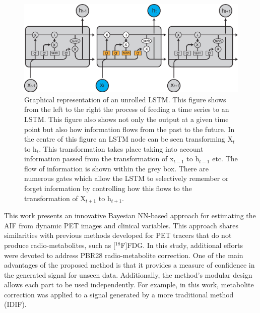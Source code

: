         \begin{figure}
            \centering
            
            \includegraphics[width=1.0\linewidth]{figures/background_lstm.png}
            
            \captionsetup{singlelinecheck=false}
            \caption{
                Graphical representation of an unrolled \gls{LSTM}. This figure shows from the left to the right the process of feeding a time series to an \gls{LSTM}. This figure also shows not only the output at a given time point but also how information flows from the past to the future. In the centre of this figure an \gls{LSTM} node can be seen transforming X$_t$ to h$_t$. This transformation takes place taking into account information passed from the transformation of x$_{t-1}$ to h$_{t-1}$ etc. The flow of information is shown within the grey box. There are numerous gates which allow the \gls{LSTM} to selectively remember or forget information by controlling how this flows to the transformation of X$_{t+1}$ to h$_{t+1}$.
            }
            \label{fig:a_bayesian_neural_network-based_method_for_the_extraction_of_a_metabolite_corrected_arterial_input_function_from_dynamic_pbr28_pet_appendix_results_lstm}
        \end{figure}
       
        This work presents an innovative Bayesian \gls{NN}-based approach for estimating the \gls{AIF} from dynamic \gls{PET} images and clinical variables. This approach shares similarities with previous methods developed for \gls{PET} tracers that do not produce radio-metabolites, such as [$^{18}$F]\gls{FDG}. In this study, additional efforts were devoted to address \gls{PBR28} radio-metabolite correction. One of the main advantages of the proposed method is that it provides a measure of confidence in the generated signal for unseen data. Additionally, the method's modular design allows each part to be used independently. For example, in this work, metabolite correction was applied to a signal generated by a more traditional method (\gls{IDIF}). 
        
